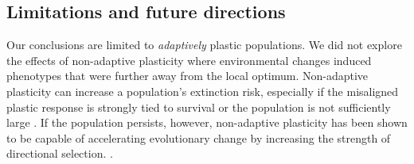 
\vspace{0.25cm}
\subsection{Limitations and future directions}


Our conclusions are limited to \textit{adaptively} plastic populations.
We did not explore the effects of non-adaptive plasticity where environmental changes induced phenotypes that were further away from the local optimum.
Non-adaptive plasticity can increase a population's extinction risk, especially if the misaligned plastic response is strongly tied to survival or the population is not sufficiently large \citep{gomulkiewicz_when_1995,chevin_adaptation_2010}.
If the population persists, however, non-adaptive plasticity has been shown to be capable of accelerating evolutionary change by increasing the strength of directional selection. \citep{ghalambor_non-adaptive_2015}.

